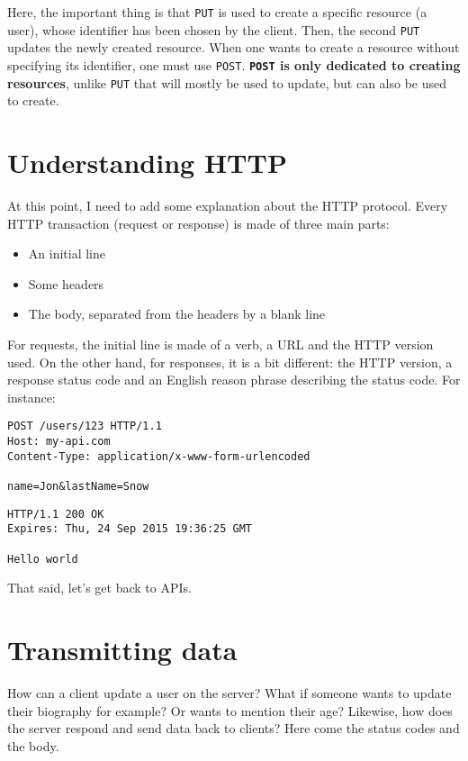 Here, the important thing is that \lstinline{PUT} is used to create a specific resource (a user), whose identifier has been chosen by the client. Then, the second \lstinline{PUT} updates the newly created resource. When one wants to create a resource without specifying its identifier, one must use \lstinline{POST}. \textbf{\lstinline{POST} is only dedicated to creating resources}, unlike \lstinline{PUT} that will mostly be used to update, but can also be used to create.

\section{Understanding HTTP}

At this point, I need to add some explanation about the HTTP protocol. Every HTTP transaction (request or response) is made of three main parts:

\begin{itemize}
  \item An initial line
  \item Some headers
  \item The body, separated from the headers by a blank line
\end{itemize}

For requests, the initial line is made of a verb, a URL and the HTTP version used. On the other hand, for responses, it is a bit different: the HTTP version, a response status code and an English reason phrase describing the status code. For instance:

\begin{lstlisting}
POST /users/123 HTTP/1.1
Host: my-api.com
Content-Type: application/x-www-form-urlencoded

name=Jon&lastName=Snow
\end{lstlisting}
\begin{lstlisting}
HTTP/1.1 200 OK
Expires: Thu, 24 Sep 2015 19:36:25 GMT

Hello world
\end{lstlisting}
That said, let's get back to APIs.

\section{Transmitting data}

How can a client update a user on the server? What if someone wants to update their biography for example? Or wants to mention their age? Likewise, how does the server respond and send data back to clients? Here come the status codes and the body.

